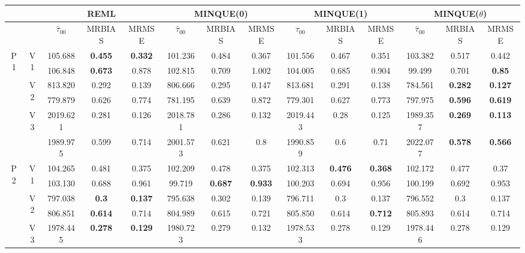 \documentclass[12pt,a4paper]{article}
\begin{document}
\begin{sidewaystable}[ht]
\centering
{\footnotesize
\begin{tabular}{cc|ccc|ccc|ccc|ccc|}
   & & \multicolumn{3}{c|}{REML}&\multicolumn{3}{c|}{MINQUE(0)}&\multicolumn{3}{c|}{MINQUE(1)}&\multicolumn{3}{c|}{MINQUE($\theta$)}\\ \hline
 &  & $\hat{\tau}_{00}$ & MRBIAS & MRMSE & $\hat{\tau}_{00}$ & MRBIAS & MRMSE & $\hat{\tau}_{00}$ & MRBIAS & MRMSE & $\hat{\tau}_{00}$ & MRBIAS & MRMSE \\ 
  \hline
\multirow{6}{*}{P1} & \multirow{2}{*}{V1} & 105.688 & \textbf{0.455} & \textbf{0.332} & 101.236 & 0.484 & 0.367 & 101.556 & 0.467 & 0.351 & 103.382 & 0.517 & 0.442 \\ 
   &  & 106.848 & \textbf{0.673} & 0.878 & 102.815 & 0.709 & 1.002 & 104.005 & 0.685 & 0.904 & 99.499 & 0.701 & \textbf{0.85} \\ 
   & \multirow{2}{*}{V2} & 813.820 & 0.292 & 0.139 & 806.666 & 0.295 & 0.147 & 813.681 & 0.291 & 0.138 & 784.561 & \textbf{0.282} & \textbf{0.127} \\ 
   &  & 779.879 & 0.626 & 0.774 & 781.195 & 0.639 & 0.872 & 779.301 & 0.627 & 0.773 & 797.975 & \textbf{0.596} & \textbf{0.619} \\ 
   & \multirow{2}{*}{V3} & 2019.621 & 0.281 & 0.126 & 2018.781 & 0.286 & 0.132 & 2019.443 & 0.28 & 0.125 & 1989.357 & \textbf{0.269} & \textbf{0.113} \\ 
   &  & 1989.975 & 0.599 & 0.714 & 2001.573 & 0.621 & 0.8 & 1990.859 & 0.6 & 0.71 & 2022.077 & \textbf{0.578} & \textbf{0.566} \\ 
   \hline \hline\multirow{6}{*}{P2} & \multirow{2}{*}{V1} & 104.265 & 0.481 & 0.375 & 102.209 & 0.478 & 0.375 & 102.313 & \textbf{0.476} & \textbf{0.368} & 102.172 & 0.477 & 0.37 \\ 
   &  & 103.130 & 0.688 & 0.961 & 99.719 & \textbf{0.687} & \textbf{0.933} & 100.203 & 0.694 & 0.956 & 100.199 & 0.692 & 0.953 \\ 
   & \multirow{2}{*}{V2} & 797.038 & \textbf{0.3} & \textbf{0.137} & 795.638 & 0.302 & 0.139 & 796.711 & 0.3 & 0.137 & 796.552 & 0.3 & 0.137 \\ 
   &  & 806.851 & \textbf{0.614} & 0.714 & 804.989 & 0.615 & 0.721 & 805.850 & 0.614 & \textbf{0.712} & 805.893 & 0.614 & 0.714 \\ 
   & \multirow{2}{*}{V3} & 1978.445 & \textbf{0.278} & \textbf{0.129} & 1980.723 & 0.279 & 0.132 & 1978.533 & 0.278 & 0.129 & 1978.446 & 0.278 & 0.129 \\ 

\end{tabular}}
\end{sidewaystable}
\end{document}
